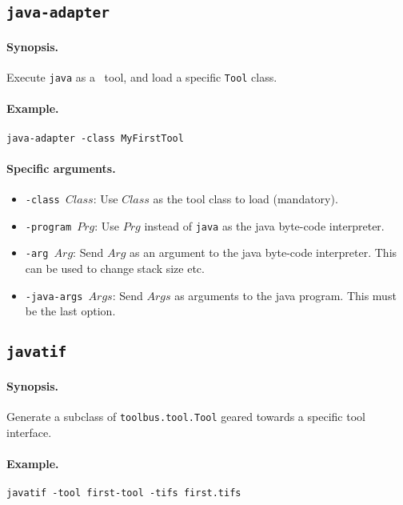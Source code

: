 \subsection{\label{java-adapter}{\tt java-adapter}}

\paragraph{Synopsis.} Execute {\tt java} as a \TB\ tool, 
and load a specific {\tt Tool} class.

\paragraph{Example.} {\tt java-adapter -class MyFirstTool}

\paragraph{Specific arguments.}
\begin{itemize}
\item {\tt -class $Class$}: Use $Class$ as the tool class to load (mandatory).
\item {\tt -program $Prg$}: Use $Prg$ instead of {\tt java} as the java byte-code
	interpreter.
\item {\tt -arg $Arg$}: Send $Arg$ as an argument to the java byte-code
	interpreter. This can be used to change stack size etc.
\item {\tt -java-args $Args$}: Send $Args$ as arguments to the java program.
	This must be the last option.
\end{itemize}

\subsection{\label{javatif}{\tt javatif}}

\paragraph{Synopsis.} Generate a subclass of {\tt toolbus.tool.Tool}
geared towards a specific tool interface.

\paragraph{Example.} {\tt javatif -tool first-tool -tifs first.tifs}

